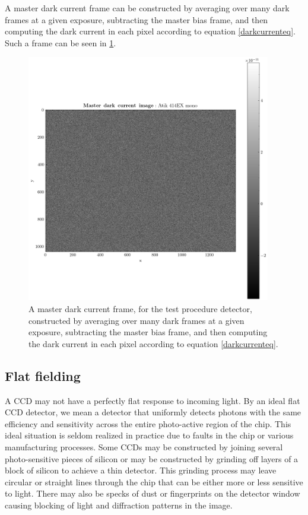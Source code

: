 \documentclass[../main.tex]{subfiles}
\begin{document}
	A master dark current frame can be constructed by averaging over many dark frames at a given exposure, subtracting the master bias frame, and then computing the dark current in each pixel according to equation \ref{darkcurrenteq}. Such a frame can be seen in \ref{fig:masterdarkcurrent}.
	\begin{figure}[h!]
		\centering
		\includegraphics[width	=0.95\textwidth]{master_dark.png}
		\caption{A master dark current frame, for the test procedure detector, constructed by averaging over many dark frames at a given exposure, subtracting the master bias frame, and then computing the dark current in each pixel according to equation \ref{darkcurrenteq}.}
		\label{fig:masterdarkcurrent}
	\end{figure}
	
	\subsection{Flat fielding}\label{sec:flat}
	A CCD may not have a perfectly flat response to incoming light. By an ideal flat CCD detector, we mean a detector that uniformly detects photons with the same efficiency and sensitivity across the entire photo-active region of the chip. This ideal situation is seldom realized in practice due to faults in the chip or various manufacturing processes. Some CCDs may be constructed by joining several photo-sensitive pieces of silicon or may be constructed by grinding off layers of a block of silicon to achieve a thin detector. This grinding process may leave circular or straight lines through the chip that can be either more or less sensitive to light. There may also be specks of dust or fingerprints on the detector window causing blocking of light and diffraction patterns in the image.
	
\end{document}
